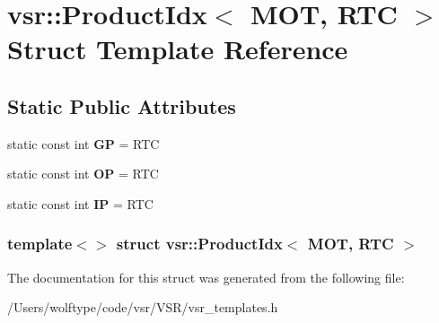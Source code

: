 \hypertarget{structvsr_1_1_product_idx_3_01_m_o_t_00_01_r_t_c_01_4}{\section{vsr\-:\-:Product\-Idx$<$ M\-O\-T, R\-T\-C $>$ Struct Template Reference}
\label{structvsr_1_1_product_idx_3_01_m_o_t_00_01_r_t_c_01_4}
}
\subsection*{Static Public Attributes}
\begin{DoxyCompactItemize}
\item 
\hypertarget{structvsr_1_1_product_idx_3_01_m_o_t_00_01_r_t_c_01_4_a1ac6dee9860ce3db68b9bda27385f587}{static const int {\bfseries G\-P} = R\-T\-C}\label{structvsr_1_1_product_idx_3_01_m_o_t_00_01_r_t_c_01_4_a1ac6dee9860ce3db68b9bda27385f587}

\item 
\hypertarget{structvsr_1_1_product_idx_3_01_m_o_t_00_01_r_t_c_01_4_acfbff0994a760085b3b6164fa3130115}{static const int {\bfseries O\-P} = R\-T\-C}\label{structvsr_1_1_product_idx_3_01_m_o_t_00_01_r_t_c_01_4_acfbff0994a760085b3b6164fa3130115}

\item 
\hypertarget{structvsr_1_1_product_idx_3_01_m_o_t_00_01_r_t_c_01_4_ad9335ea4b0627fd21ed25256adc57b8d}{static const int {\bfseries I\-P} = R\-T\-C}\label{structvsr_1_1_product_idx_3_01_m_o_t_00_01_r_t_c_01_4_ad9335ea4b0627fd21ed25256adc57b8d}

\end{DoxyCompactItemize}
\subsubsection*{template$<$$>$ struct vsr\-::\-Product\-Idx$<$ M\-O\-T, R\-T\-C $>$}



The documentation for this struct was generated from the following file\-:\begin{DoxyCompactItemize}
\item 
/\-Users/wolftype/code/vsr/\-V\-S\-R/vsr\-\_\-templates.\-h\end{DoxyCompactItemize}
